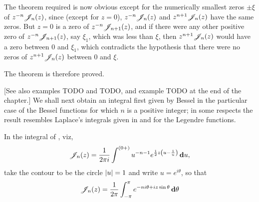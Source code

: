 The theorem required is now obvious except for the numerically
smallest zeros $\pm \xi$ of $z^{-n}\mathscr{J}_{n}(z)$, since (except for $z=0$), 
$z^{-n}\mathscr{J}_{n}(z)$ and $z^{n+1}\mathscr{J}_{n}(z)$ have the same zeros. But $z=0$ is a
zero of $z^{-n}\mathscr{J}_{n+1}(z)$, and if there were any other positive zero
of $z^{-n}\mathscr{J}_{n+1}(z)$, say $\xi_{1}$, which was less than $\xi$, then
$z^{n+1}\mathscr{J}_{n}(z)$ would have a zero between $0$ and $\xi_{1}$, which
contradicts the hypothesis that there were no zeros of 
$z^{n+1}\mathscr{J}_{n}(z)$ between $0$ and $\xi$.

The theorem is therefore proved.

[See also  examples TODO and TODO, and example
TODO at the end of the chapter.]
% 
% 
We shall next obtain an integral first given by Bessel in the
particular case of the Bessel functions for which $n$ is a positive
integer; in some respects the result resembles Laplace's integrals
given in  and 
for the Legendre functions.

In the integral of , viz, 
$$
\mathscr{J}_{n}(z) 
=
\frac{1}{2\pi i}
\int^{(0+)}
u^{-n-1}
e^{\frac{1}{2} z \left(  u - \frac{1}{u}  \right)}
\, \mathbf{d} u,
$$
take the contour to be the circle $\left| u \right| = 1$ and write 
$u = e^{i\theta}$, so that
$$
\mathscr{J}_{n}(z)
= 
\frac{1}{2\pi}
\int_{-\pi}^{\pi}
e^{-ni\theta + iz\sin\theta}
\, \mathbf{d} \theta
$$

